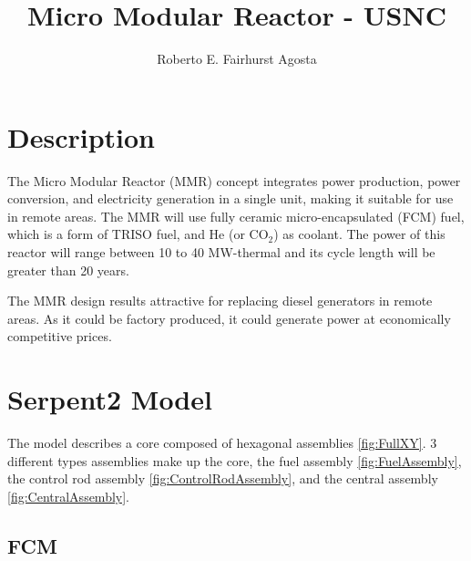 \documentclass[11pt,letterpaper]{article}
\title{Micro Modular Reactor - USNC}
\author{Roberto E. Fairhurst Agosta}
\begin{document}

\section{Description}	

The Micro Modular Reactor (MMR) concept integrates power production, power conversion, and electricity generation in a single unit, making it suitable for use in remote areas. 
The MMR will use fully ceramic micro-encapsulated (FCM) fuel, which is a form of TRISO fuel, and He (or CO$_2$) as coolant.
The power of this reactor will range between 10 to 40 MW-thermal and its cycle length will be greater than 20 years.

The MMR design results attractive for replacing diesel generators in remote areas. As it could be factory produced, it could generate power at economically competitive prices.

\section{Serpent2 Model}

The model describes a core composed of hexagonal assemblies \ref{fig:FullXY}. 3 different types assemblies make up the core, the fuel assembly \ref{fig:FuelAssembly}, the control rod assembly \ref{fig:ControlRodAssembly}, and the central assembly \ref{fig:CentralAssembly}.

\subsection{FCM}
\label{sub:FCM}
\end{document}
